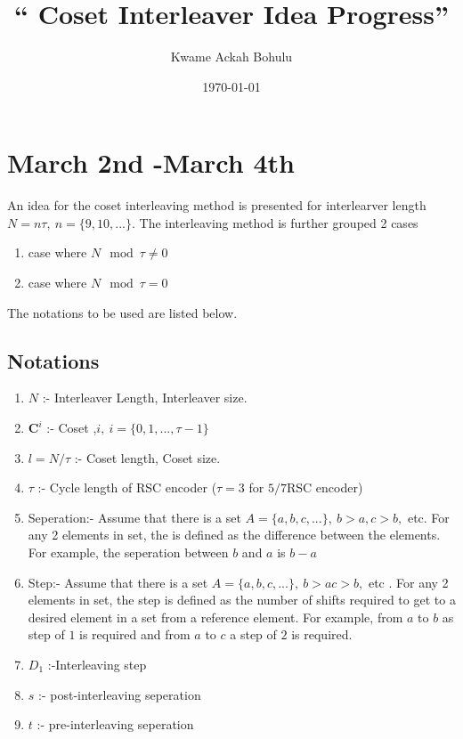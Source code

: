 \documentclass[11pt, oneside, dvipdfmx]{book}
\title{``
Coset Interleaver Idea Progress'' }
\author{Kwame Ackah Bohulu}
\date{\today}
\begin{document}
\maketitle




\section{March 2nd -March 4th}
An idea for the coset interleaving method is presented for interlearver length $N=n\tau,~n=\{9,10,...\}$. The interleaving method is further grouped 2 cases 
\begin{enumerate}
\item case where $N \mod \tau \neq 0$
\item case where $N \mod \tau = 0$
\end{enumerate}
The notations to be used are listed below.

 \subsection{Notations}
 \begin{enumerate}
 \item $N$ :- Interleaver Length, Interleaver size.
  \item $\mathbf{C}^i$ :- Coset ,$i,~i=\{0,1,...,\tau-1 \}$
 \item $l=N/\tau$ :- Coset length, Coset size.
 \item $\tau$ :- Cycle length of RSC encoder ($\tau= 3$ for $5/7$RSC encoder)
 
 \item Seperation:- Assume that there is a set $A=\{a,b,c,...\},~b>a,c>b,$ etc. For any 2 elements in set, the  is defined as the difference between the elements. For example, the seperation between $b$ and $a$ is $b-a$
 \item Step:- Assume that there is a set $A=\{a,b,c,...\},~b>ac>b,$ etc . For any 2 elements in set, the step is defined as the number of shifts required to get to a desired element in a set from a reference element. For example, from $a$ to $b$ as step of $1$ is required and from $a$ to $c$ a step of $2$ is required.
 \item $D_1$ :-Interleaving step
 \item $s$ :- post-interleaving seperation
 \item $t$ :- pre-interleaving seperation

 \end{enumerate}
 
\end{document}

